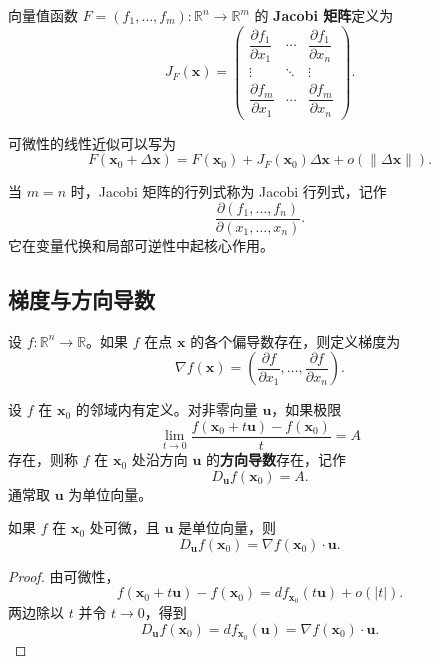 \begin{definition}[Jacobi 矩阵]
向量值函数 $F=(f_1,\dots,f_m):\mathbb{R}^n\to\mathbb{R}^m$ 的 \textbf{Jacobi 矩阵}定义为
\[
    J_F(\mathbf{x})=
    \begin{pmatrix}
        \dfrac{\partial f_1}{\partial x_1} & \cdots & \dfrac{\partial f_1}{\partial x_n} \\
        \vdots & \ddots & \vdots \\
        \dfrac{\partial f_m}{\partial x_1} & \cdots & \dfrac{\partial f_m}{\partial x_n}
    \end{pmatrix}.
\]
\end{definition}

可微性的线性近似可以写为
\[
    F(\mathbf{x}_0+\Delta\mathbf{x})
    =F(\mathbf{x}_0)+J_F(\mathbf{x}_0)\Delta\mathbf{x}+o(\|\Delta\mathbf{x}\|).
\]

当 $m=n$ 时，Jacobi 矩阵的行列式称为 Jacobi 行列式，记作
\[
    \frac{\partial(f_1,\dots,f_n)}{\partial(x_1,\dots,x_n)}.
\]
它在变量代换和局部可逆性中起核心作用。

\subsection{梯度与方向导数}

\begin{definition}[梯度]
设 $f:\mathbb{R}^n\to\mathbb{R}$。如果 $f$ 在点 $\mathbf{x}$ 的各个偏导数存在，则定义梯度为
\[
    \nabla f(\mathbf{x})=
    \left(\frac{\partial f}{\partial x_1},\dots,
    \frac{\partial f}{\partial x_n}\right).
\]
\end{definition}

\begin{definition}[方向导数]
设 $f$ 在 $\mathbf{x}_0$ 的邻域内有定义。对非零向量 $\mathbf{u}$，如果极限
\[
    \lim_{t\to0}\frac{f(\mathbf{x}_0+t\mathbf{u})-f(\mathbf{x}_0)}{t}=A
\]
存在，则称 $f$ 在 $\mathbf{x}_0$ 处沿方向 $\mathbf{u}$ 的\textbf{方向导数}存在，记作
\[
    D_{\mathbf{u}}f(\mathbf{x}_0)=A.
\]
通常取 $\mathbf{u}$ 为单位向量。
\end{definition}

\begin{theorem}[方向导数公式]
如果 $f$ 在 $\mathbf{x}_0$ 处可微，且 $\mathbf{u}$ 是单位向量，则
\[
    D_{\mathbf{u}}f(\mathbf{x}_0)=\nabla f(\mathbf{x}_0)\cdot\mathbf{u}.
\]
\end{theorem}

\begin{proof}
由可微性，
\[
    f(\mathbf{x}_0+t\mathbf{u})-f(\mathbf{x}_0)
    =df_{\mathbf{x}_0}(t\mathbf{u})+o(|t|).
\]
两边除以 $t$ 并令 $t\to0$，得到
\[
    D_{\mathbf{u}}f(\mathbf{x}_0)=df_{\mathbf{x}_0}(\mathbf{u})
    =\nabla f(\mathbf{x}_0)\cdot\mathbf{u}.
\]
\end{proof}

